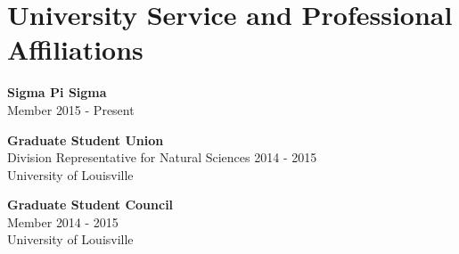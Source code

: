 

\section*{University Service and Professional Affiliations}



\smallskip
\LeftRight
{
	\textbf{Sigma Pi Sigma}\\
	Member
}
{
	2015 - Present
}




\smallskip
\LeftRight
{
	\textbf{Graduate Student Union}\\
	Division Representative for Natural Sciences
}
{
	2014 - 2015\\
	University of Louisville
}




\smallskip
\LeftRight
{
	\textbf{Graduate Student Council}\\
	Member
}
{
	2014 - 2015\\
	University of Louisville
}
